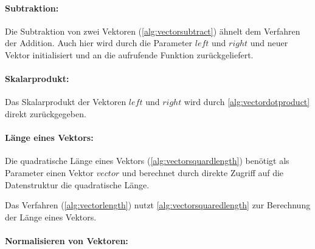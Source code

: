 
\paragraph{Subtraktion:} %
\label{par:subtraktion}

Die Subtraktion von zwei Vektoren (\autoref{alg:vectorsubtract}) ähnelt dem Verfahren der Addition. Auch hier wird
 durch die Parameter $\mathit{left}$ und $\mathit{right}$ und neuer Vektor initialisiert und an die aufrufende Funktion
 zurückgeliefert.




\paragraph{Skalarprodukt:} %
\label{par:skalarprodukt}

Das Skalarprodukt der Vektoren $\mathit{left}$ und $\mathit{right}$ wird durch \autoref{alg:vectordotproduct} direkt
 zurückgegeben.




\paragraph{Länge eines Vektors:} %
\label{par:länge_eines_vektors}

Die quadratische Länge eines Vektors (\autoref{alg:vectorsquardlength}) benötigt als Parameter einen Vektor
 $\mathit{vector}$ und berechnet durch direkte Zugriff auf die Datenstruktur die quadratische Länge.



Das Verfahren  (\autoref{alg:vectorlength}) nutzt \autoref{alg:vectorsquaredlength} zur Berechnung der
 Länge eines Vektors.




\paragraph{Normalisieren von Vektoren:} %
\label{par:normalisieren_von_vektoren}

